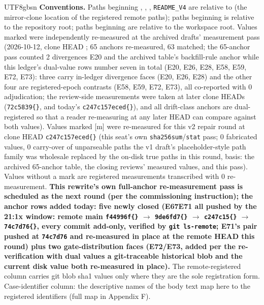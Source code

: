 \documentclass[11pt,letterpaper]{article}
\begin{document}
\begin{CJK}{UTF8}{gbsn}
\textbf{Conventions.} Paths beginning , , , \texttt{README\_V4} are relative to  (the mirror-clone location of the registered remote paths); paths beginning  is relative to the repository root; paths beginning  are relative to the workspace root. Values marked  were independently re-measured at the archived drafts' measurement pass (2026-10-12, clone HEAD ; 65 anchors re-measured, 63 matched; the 65-anchor pass counted 2 divergences \textemdash{} E20 and the archived table's backfill-rule anchor \textemdash{} while this ledger's dual-value rows number seven in total (E20, E26, E28, E58, E59, E72, E73): three carry in-ledger divergence faces (E20, E26, E28) and the other four are registered-epoch contrasts (E58, E59, E72, E73), all co-reported with 0 adjudication; the review-side measurements were taken at later clone HEADs (\texttt{72c5839\textellipsis\{\}}, and today's \texttt{c247c157eced\textellipsis\{\}}), and all drift-class anchors are dual-registered so that a reader re-measuring at any later HEAD can compare against both values). Values marked [m] were re-measured for this v2 repair round at clone HEAD \texttt{c247c157eced\textellipsis\{\}} (this seat's own \texttt{sha256sum}/\texttt{stat} pass; 0 fabricated values, 0 carry-over of unparseable paths \textemdash{} the v1 draft's placeholder-style path family was wholesale replaced by the on-disk true paths in this round, basis: the archived 65-anchor table, the closing reviews' measured values, and this pass). Values without a mark are registered measurements transcribed with 0 re-measurement. \textbf{This rewrite's own full-anchor re-measurement pass is scheduled as the next round (per the commissioning instruction); the anchor rows added today: five newly closed (E67\textendash{}E71 \textemdash{} all pushed by the 21:1x window: remote main \texttt{f44996f\textellipsis\{\}} \ensuremath{\to} \texttt{9de6fd7\textellipsis\{\}} \ensuremath{\to} \texttt{c247c15\textellipsis\{\}} \ensuremath{\to} \texttt{74c7d76\textellipsis\{\}}, every commit add-only, verified by \texttt{git ls-remote}; E71's pair pushed at \texttt{74c7d76} and re-measured in place at the remote HEAD this round) plus two gate-distribution faces (E72/E73, added per the re-verification with dual values \textemdash{} a git-traceable historical blob and the current disk value \textemdash{} both re-measured in place).} The remote-registered column carries git blob sha1 values only where they are the sole registration form. Case-identifier column: the descriptive names of the body text map here to the registered identifiers (full map in Appendix F).


\end{CJK}
\end{document}
